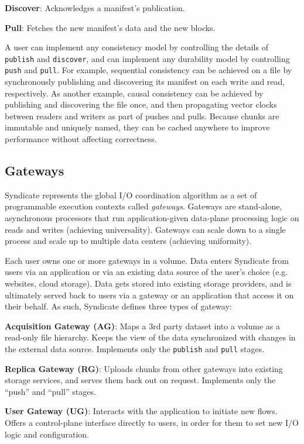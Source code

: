 \textbf{Discover}: Acknowledges a manifest's publication.

\textbf{Pull}: Fetches the new manifest's data and the new blocks.

A user can implement any consistency model by controlling the details of
\texttt{publish} and \texttt{discover}, and can implement any durability model
by controlling \texttt{push} and \texttt{pull}. For example, sequential
consistency can be achieved on a file by synchronously publishing and
discovering its manifest on each write and read, respectively. As another
example, causal consistency can be achieved by publishing and discovering the
file once, and then propagating vector clocks between readers and writers as
part of pushes and pulls. Because chunks are immutable and uniquely named, they
can be cached anywhere to improve performance without affecting correctness.

\subsection{Gateways}

Syndicate represents the global I/O coordination algorithm as a set of
programmable execution contexts called \textit{gateways}. Gateways are stand-alone,
asynchronous processors that run application-given data-plane processing logic
on reads and writes (achieving universality). Gateways can scale down to a
single process and scale up to multiple data centers (achieving uniformity).

Each user owns one or more gateways in a volume. Data enters Syndicate from
users via an application or via an existing data source of the user's choice
(e.g. websites, cloud storage). Data gets stored into existing storage
providers, and is ultimately served back to users via a gateway or an
application that access it on their behalf. As such, Syndicate defines three
types of gateway:

\textbf{Acquisition Gateway (AG)}: Maps a 3rd party dataset into a volume as a read-only
file hierarchy. Keeps the view of the data synchronized with changes in the
external data source. Implements only the \texttt{publish} and \texttt{pull}
stages.

\textbf{Replica Gateway (RG)}: Uploads chunks from other gateways into existing
storage services, and serves them back out on request. Implements only the
``push'' and ``pull'' stages.

\textbf{User Gateway (UG)}: Interacts with the
application to initiate new flows. Offers a control-plane interface directly to
users, in order for them to set new I/O logic and configuration.

